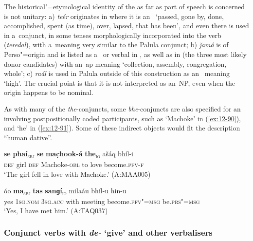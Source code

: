 The historical"=etymological identity of the  as far as part of speech is concerned is not unitary: a) \textit{teér} originates in \iliPashto where it is an~ `passed, gone by, done, accomplished, spent (as time), over, lapsed, that has been', and even there is used in a~conjunct, in some tenses morphologically incorporated into the verb (\textit{teredal}), with a~meaning very similar to the Palula conjunct; b) \textit{ǰamá} is of Perso"=\iliArabic origin and is listed as a~ or verbal  in \iliUrdu, \iliPashto as well as in \iliPersian (the three most likely donor candidates) with an~ap meaning `collection, assembly, congregation, whole'; c) \textit{raál} is used in Palula outside of this construction as an~ meaning `high'. The crucial point is that it is not interpreted as an~NP, even when the origin happens to be nominal. 


As with many of the \textit{the}-conjuncts, some \textit{bhe}-conjuncts are also specified for an~ involving postpositionally coded participants, such as `Machoke' in (\ref{ex:12-90}), and `he' in (\ref{ex:12-91}). Some of these indirect objects would fit the description ``human dative''. 

\begin{exe}
\ex
\label{ex:12-90}
\gll {\ob}\textbf{se} \textbf{phaí}{\cb}\textsubscript{\textsc{\upshape sbj}} {\ob}\textbf{se} \textbf{mac̣hook-á} \textbf{the}{\cb}\textsubscript{\textsc{\upshape io}} ašáq bhíl-i\\
\textsc{def} girl \textsc{def} Machoke-\textsc{obl} to love  become.\textsc{pfv-f}\\
\glt `The girl fell in love with Machoke.' (A:MAA005)
\end{exe}
\begin{exe}
\ex
\label{ex:12-91}
\gll óo {\ob}\textbf{ma}{\cb}\textsubscript{\textsc{\upshape sbj}} {\ob}\textbf{tas} \textbf{sanɡí}{\cb}\textsubscript{\textsc{\upshape io}} milaáu bhíl-u hin-u\\
yes \textsc{1sg.nom} \textsc{3sg.acc} with meeting become.\textsc{pfv"=msg}  be.\textsc{prs"=msg}\\
\glt `Yes, I have met him.' (A:TAQ037)
\end{exe}

\subsubsection*{Conjunct verbs with \textit{de-} `give' and other verbalisers}

